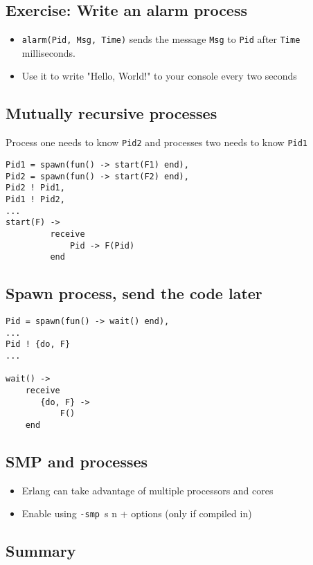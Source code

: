 \documentclass[12pt]{article}
\begin{document}
\begin{itemize}
\subsection{Exercise: Write an alarm process}

\begin{itemize}
\item \verb+alarm(Pid, Msg, Time)+ sends the message \verb+Msg+ to
  \verb+Pid+ after \verb+Time+ milliseconds.
\item Use it to write "Hello, World!" to your console every two
  seconds
\end{itemize}


\subsection{Mutually recursive processes}

Process one needs to know \verb+Pid2+ and processes two needs to know
\verb+Pid1+

\begin{verbatim}
Pid1 = spawn(fun() -> start(F1) end),
Pid2 = spawn(fun() -> start(F2) end),
Pid2 ! Pid1,
Pid1 ! Pid2,
...
start(F) ->
         receive
             Pid -> F(Pid)
         end
\end{verbatim}

\subsection{Spawn process, send the code later}

\begin{verbatim}
Pid = spawn(fun() -> wait() end),
...
Pid ! {do, F}
...

wait() ->
    receive
       {do, F} ->
           F()
    end
\end{verbatim}

\subsection{SMP and processes}

\begin{itemize}
\item Erlang can take advantage of multiple processors and cores
\item Enable using \verb+-smp +s n + options (only if compiled in)
\end{itemize}

\subsection{Summary}


\end{itemize}
\end{document}
